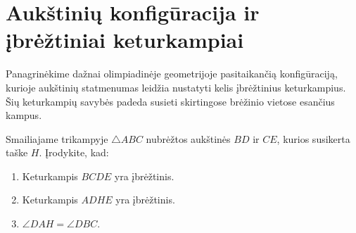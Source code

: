 \documentclass[11pt,a4paper]{scrartcl}
\begin{document}
\section{Aukštinių konfigūracija ir įbrėžtiniai keturkampiai}
Panagrinėkime dažnai olimpiadinėje geometrijoje pasitaikančią konfigūraciją, kurioje aukštinių statmenumas leidžia nustatyti kelis įbrėžtinius keturkampius. Šių keturkampių savybės padeda susieti skirtingose brėžinio vietose esančius kampus.
\begin{example}
Smailiajame trikampyje $\triangle ABC$ nubrėžtos aukštinės $BD$ ir $CE$, kurios susikerta taške $H$. Įrodykite, kad:
\begin{enumerate}
    \renewcommand{\labelenumi}{\arabic{enumi})}
    \item Keturkampis $BCDE$ yra įbrėžtinis.
    \item Keturkampis $ADHE$ yra įbrėžtinis.
    \item $\angle DAH = \angle DBC$.
\end{enumerate}
\end{example}
\end{document}
